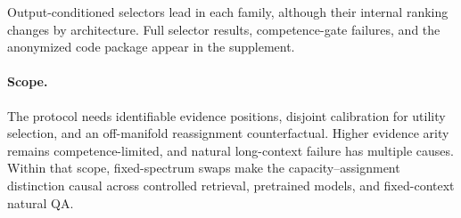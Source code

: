 \documentclass[letterpaper]{article} %
\begin{document}
Output-conditioned selectors lead in each family, although their internal ranking changes by architecture. Full
selector results, competence-gate failures, and the anonymized code package appear in the supplement.

\paragraph{Scope.}
The protocol needs identifiable evidence positions, disjoint calibration for utility selection, and an
off-manifold reassignment counterfactual. Higher evidence arity remains competence-limited, and natural
long-context failure has multiple causes. Within that scope, fixed-spectrum swaps make the
capacity--assignment distinction causal across controlled retrieval, pretrained models, and fixed-context natural QA.

{\small

}
\end{document}
